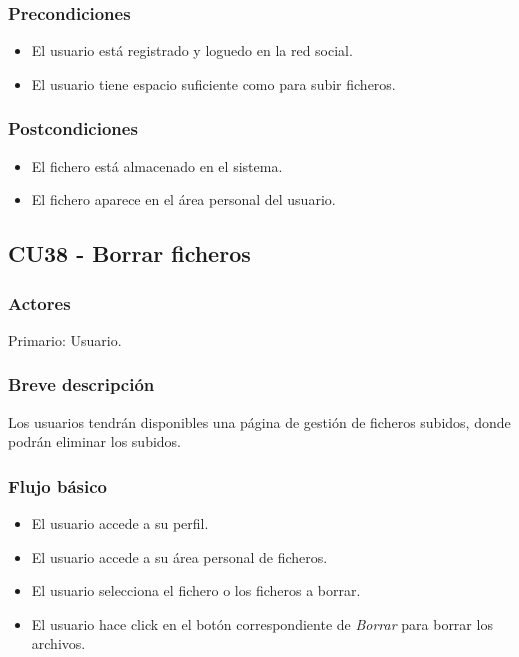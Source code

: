 \documentclass[12pt, a4paper, titlepage]{article}
\begin{document}
\subsubsection{Precondiciones}
	\begin{itemize}
		\item El usuario está registrado y loguedo en la red social.
		\item El usuario tiene espacio suficiente como para subir ficheros.
	\end{itemize}

\subsubsection{Postcondiciones}
	\begin{itemize}
		\item El fichero está almacenado en el sistema.
		\item El fichero aparece en el área personal del usuario.
	\end{itemize}

\subsection{CU38 - Borrar ficheros}
\subsubsection{Actores}
Primario: Usuario.
\subsubsection{Breve descripción}
Los usuarios tendrán disponibles una página de gestión de ficheros subidos, donde podrán eliminar los subidos.
\subsubsection{Flujo básico}
	\begin{itemize}
		\item El usuario accede a su perfil.
		\item El usuario accede a su área personal de ficheros.
		\item El usuario selecciona el fichero o los ficheros a borrar.
		\item El usuario hace click en el botón correspondiente de \textit{Borrar} para borrar los archivos.
	\end{itemize}
\end{document}

